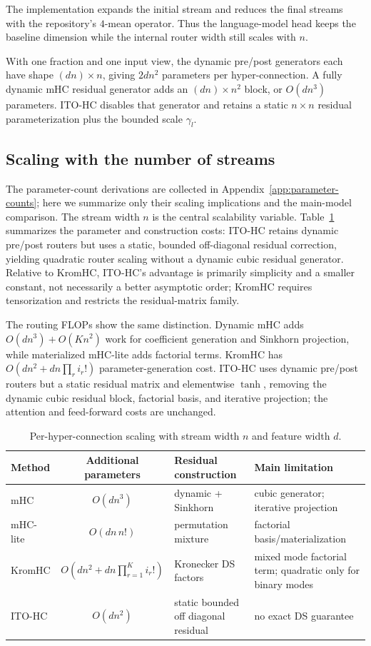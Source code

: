\documentclass{article}
\begin{document}
The implementation expands the initial stream and reduces the final streams with the repository's $4$-mean operator. Thus the language-model head keeps the baseline dimension while the internal router width still scales with $n$.

With one fraction and one input view, the dynamic pre/post generators each have shape $(dn)\times n$, giving $2dn^2$ parameters per hyper-connection. A fully dynamic mHC residual generator adds an $(dn)\times n^2$ block, or $O(dn^3)$ parameters. ITO-HC disables that generator and retains a static $n\times n$ residual parameterization plus the bounded scale $\gamma_l$.

\subsection{Scaling with the number of streams}
The parameter-count derivations are collected in Appendix~\ref{app:parameter-counts}; here we summarize only their scaling implications and the main-model comparison.
The stream width $n$ is the central scalability variable. Table~\ref{tab:scaling} summarizes the parameter and construction costs: ITO-HC retains dynamic pre/post routers but uses a static, bounded off-diagonal residual correction, yielding quadratic router scaling without a dynamic cubic residual generator. Relative to KromHC, ITO-HC's advantage is primarily simplicity and a smaller constant, not necessarily a better asymptotic order; KromHC requires tensorization and restricts the residual-matrix family.

The routing FLOPs show the same distinction. Dynamic mHC adds $O(dn^3)+O(Kn^2)$ work for coefficient generation and Sinkhorn projection, while materialized mHC-lite adds factorial terms. KromHC has $O(dn^2+dn\prod_r i_r!)$ parameter-generation cost. ITO-HC uses dynamic pre/post routers but a static residual matrix and elementwise $\tanh$, removing the dynamic cubic residual block, factorial basis, and iterative projection; the attention and feed-forward costs are unchanged.

\begin{table}[t]
\caption{Per-hyper-connection scaling with stream width $n$ and feature width $d$.}
\label{tab:scaling}
\begin{center}
\small
\begin{tabularx}{\linewidth}{@{}l c X X@{}}
\toprule
Method & Additional parameters & Residual construction & Main limitation\\
\midrule
mHC & $O(dn^3)$ & dynamic + Sinkhorn & cubic generator; iterative projection\\
mHC-lite & $O(dn\,n!)$ & permutation mixture & factorial basis/materialization\\
KromHC & $O\!\left(dn^2+dn\prod_{r=1}^{K}i_r!\right)$ & Kronecker DS factors & mixed mode factorial term; quadratic only for binary modes\\
ITO-HC & $O(dn^2)$ & static bounded off diagonal residual & no exact DS guarantee\\
\bottomrule
\end{tabularx}
\end{center}
\end{table}
\end{document}
